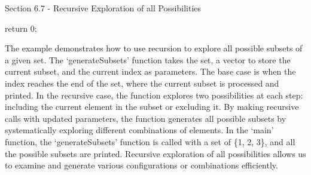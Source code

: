\begin{notes}{Section 6.7 - Recursive Exploration of all Possibilities}
\begin{highlight}
\begin{code}[C++]
{        return 0;
    }
    \end{code}
        The example demonstrates how to use recursion to explore all possible subsets of a given set. The `generateSubsets' function takes the set, a vector to store the current subset, and the current index as parameters. The base case is when the index reaches the end of the set, where the current subset is processed and printed. 
        In the recursive case, the function explores two possibilities at each step: including the current element in the subset or excluding it. By making recursive calls with updated parameters, the function generates all possible subsets by systematically exploring different combinations of elements. In the `main' function, the 
        `generateSubsets' function is called with a set of \{1, 2, 3\}, and all the possible subsets are printed. Recursive exploration of all possibilities allows us to examine and generate various configurations or combinations efficiently.
    \end{highlight}
\end{notes}

